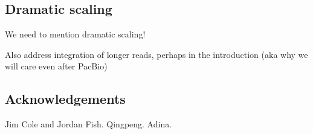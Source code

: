 \documentclass[12pt]{article} \usepackage{simplemargins}
\begin{document}
\subsection{Dramatic scaling}

We need to mention dramatic scaling!

Also address integration of longer reads, perhaps in the introduction
(aka why we will care even after PacBio)

\subsection{Acknowledgements}

Jim Cole and Jordan Fish.  Qingpeng.  Adina.




\end{document}

